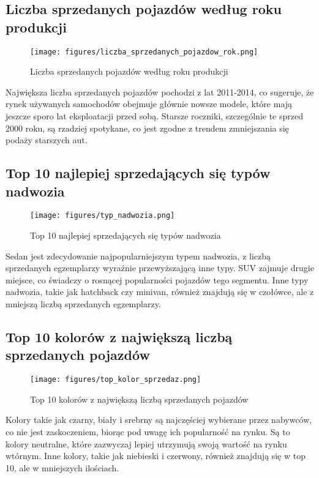 \documentclass[10pt,letterpaper]{article}
\begin{document}
\subsection{Liczba sprzedanych pojazdów według roku produkcji}
\begin{figure}[H]
\begin{center}
   \texttt{[image: figures/liczba\_sprzedanych\_pojazdow\_rok.png]}
   \caption{Liczba sprzedanych pojazdów według roku produkcji}
   \label{fig:other-figure-log}
\end{center}
\end{figure}
Największa liczba sprzedanych pojazdów pochodzi z lat 2011-2014, co sugeruje, że rynek używanych samochodów obejmuje głównie nowsze modele, które mają jeszcze sporo lat eksploatacji przed sobą. Starsze roczniki, szczególnie te sprzed 2000 roku, są rzadziej spotykane, co jest zgodne z trendem zmniejszania się podaży starszych aut.

\subsection{Top 10 najlepiej sprzedających się typów nadwozia}
\begin{figure}[H]
\begin{center}
   \texttt{[image: figures/typ\_nadwozia.png]}
   \caption{Top 10 najlepiej sprzedających się typów nadwozia}
   \label{fig:other-figure-log}
\end{center}
\end{figure}
Sedan jest zdecydowanie najpopularniejszym typem nadwozia, z liczbą sprzedanych egzemplarzy wyraźnie przewyższającą inne typy. SUV zajmuje drugie miejsce, co świadczy o rosnącej popularności pojazdów tego segmentu. Inne typy nadwozia, takie jak hatchback czy minivan, również znajdują się w czołówce, ale z mniejszą liczbą sprzedanych egzemplarzy.

\subsection{Top 10 kolorów z największą liczbą sprzedanych pojazdów}
\begin{figure}[H]
\begin{center}
   \texttt{[image: figures/top\_kolor\_sprzedaz.png]}
   \caption{Top 10 kolorów z największą liczbą sprzedanych pojazdów}
   \label{fig:other-figure-log}
\end{center}
\end{figure}
Kolory takie jak czarny, biały i srebrny są najczęściej wybierane przez nabywców, co nie jest zaskoczeniem, biorąc pod uwagę ich popularność na rynku. Są to kolory neutralne, które zazwyczaj lepiej utrzymują swoją wartość na rynku wtórnym. Inne kolory, takie jak niebieski i czerwony, również znajdują się w top 10, ale w mniejszych ilościach.
\end{document}

